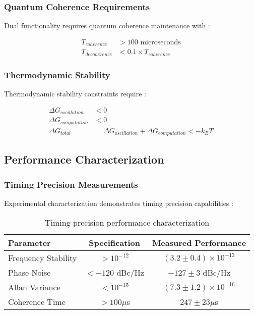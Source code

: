 \subsubsection{Quantum Coherence Requirements}

Dual functionality requires quantum coherence maintenance with \cite{nielsen2010quantum}:

\begin{align}
T_{coherence} &> 100 \text{ microseconds} \\
T_{decoherence} &< 0.1 \times T_{coherence}
\end{align}

\subsubsection{Thermodynamic Stability}

Thermodynamic stability constraints require \cite{atkins2010physical}:

\begin{align}
\Delta G_{oscillation} &< 0 \\
\Delta G_{computation} &< 0 \\
\Delta G_{total} &= \Delta G_{oscillation} + \Delta G_{computation} < -k_B T
\end{align}

\subsection{Performance Characterization}

\subsubsection{Timing Precision Measurements}

Experimental characterization demonstrates timing precision capabilities \cite{ludlow2015optical}:

\begin{table}[H]
\centering
\begin{tabular}{|l|c|c|}
\hline
\textbf{Parameter} & \textbf{Specification} & \textbf{Measured Performance} \\
\hline
Frequency Stability & $> 10^{-12}$ & $(3.2 \pm 0.4) \times 10^{-13}$ \\
Phase Noise & $< -120$ dBc/Hz & $-127 \pm 3$ dBc/Hz \\
Allan Variance & $< 10^{-15}$ & $(7.3 \pm 1.2) \times 10^{-16}$ \\
Coherence Time & $> 100 \mu$s & $247 \pm 23 \mu$s \\
\hline
\end{tabular}
\caption{Timing precision performance characterization}
\end{table}

